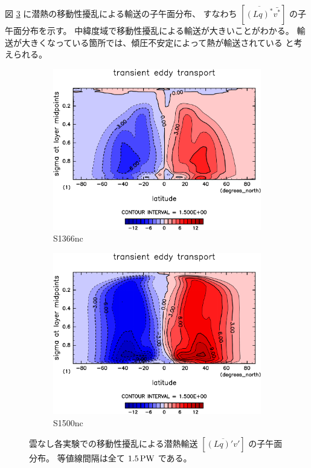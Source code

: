 \documentclass[body]{subfiles}
\begin{document}
図 \ref{潜熱移動性擾乱nc} に潜熱の移動性擾乱による輸送の子午面分布、
すなわち \([\overline{(Lq)^*}\bar{v^*}]\) の子午面分布を示す。
中緯度域で移動性擾乱による輸送が大きいことがわかる。
輸送が大きくなっている箇所では、傾圧不安定によって熱が輸送されている
と考えられる。

\begin{figure}[t]
	\centering
	\begin{subfigure}{.4\textwidth}
		\centering
		\includegraphics[width=\columnwidth]{S1366-nc/MeriHeatTransTest@latentEn_TE,time=3650:4015-crop-rotate.pdf}
		\caption{S1366nc}\label{潜熱移動性擾乱S1366nc}
	\end{subfigure}
	\begin{subfigure}{.4\textwidth}
		\centering
		\includegraphics[width=\columnwidth]{S1500-nc/MeriHeatTransTest@latentEn_TE,time=3650:4015-crop-rotate.pdf}
		\caption{S1500nc}\label{潜熱移動性擾乱S1500nc}
	\end{subfigure}
	\caption[雲なし各実験での移動性擾乱による潜熱輸送の子午面分布]{
		雲なし各実験での移動性擾乱による潜熱輸送 \([\overline{(Lq)'v'}]\) の子午面分布。
		等値線間隔は全て \(1.5\hmu{PW}\) である。
	}\label{潜熱移動性擾乱nc}
\end{figure}
\end{document}
